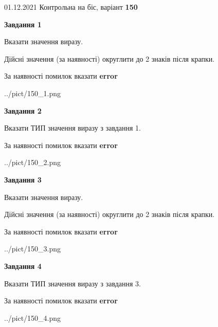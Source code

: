 \documentclass[11pt, ukrainian]{article}
\begin{document}
{01.12.2021 Контрольна на біс, варіант  \No \textbf { 150 }\par}
{
\begin {large}
{\begin {center}\textbf{Завдання 1}\end {center}}\par
Вказати значення виразу. \par
Дійсні значення (за наявності) округлити до 2 знаків після крапки. \par
За наявності помилок вказати \textbf{error}

\begin{center}
	{../pict/150_1.png}
\end{center}
\newpage

{\begin {center}\textbf{Завдання 2}\end {center}}\par
Вказати ТИП значення виразу з завдання 1. \par
За наявності помилок вказати \textbf{error}

\begin{center}
	{../pict/150_2.png}
\end{center}
\newpage

{\begin {center}\textbf{Завдання 3}\end {center}}\par
Вказати значення виразу. \par
Дійсні значення (за наявності) округлити до 2 знаків після крапки. \par
За наявності помилок вказати \textbf{error}

\begin{center}
	{../pict/150_3.png}
\end{center}
\newpage

{\begin {center}\textbf{Завдання 4}\end {center}}\par
Вказати ТИП значення виразу з завдання 3. \par
За наявності помилок вказати \textbf{error}

\begin{center}
	{../pict/150_4.png}
\end{center}
\newpage


\end{large}}
\end{document}
